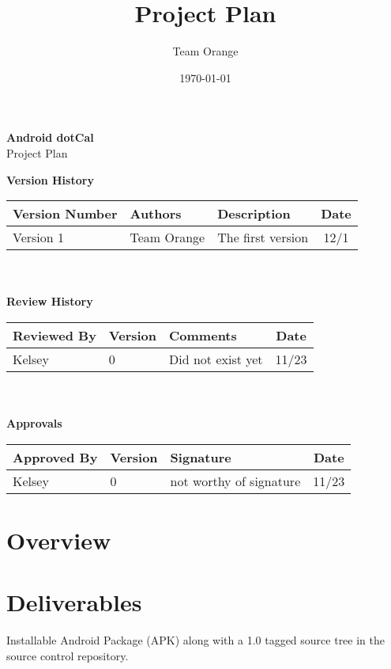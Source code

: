 \documentclass[11pt]{article}
\title{Project Plan}
\author{Team Orange}
\date{\today}
\begin{document}
\begin{centering}
\textbf{\huge{Android dotCal}}\\
\LARGE{Project Plan}

\end{centering}


\vspace{1cm}
\textbf{\large{Version History}}

\begin{tabular}{|l|l|l|c|}
\hline
Version Number & Authors & Description & Date\\
\hline
Version 1 & Team Orange & The first version & 12/1 \\
\hline
\end{tabular}\\\\

\textbf{\large{Review History}}

\begin{tabular}{|l|l|l|c|}
\hline
Reviewed By & Version & Comments & Date\\
\hline
Kelsey & 0 & Did not exist yet & 11/23 \\
\hline
\end{tabular}\\\\

\textbf{\large{Approvals}}

\begin{tabular}{|l|l|l|c|}
\hline
Approved By & Version & Signature & Date\\
\hline
Kelsey & 0 & not worthy of signature & 11/23 \\
\hline
\end{tabular}


\section{Overview}

\section{Deliverables}
Installable Android Package (APK) along with a 1.0 tagged source tree in the source control repository.
\end{document}
